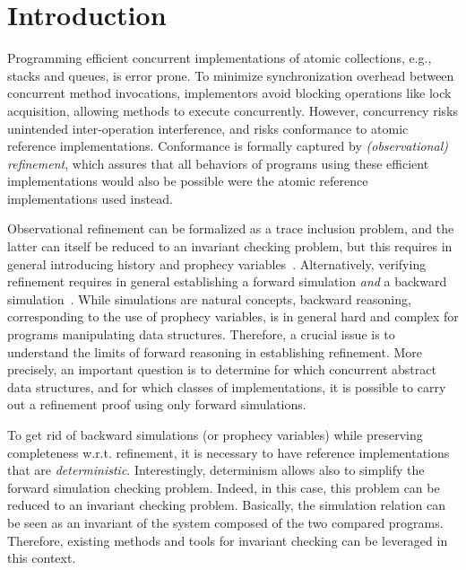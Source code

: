 \section{Introduction}
\vspace{-1mm}
Programming efficient concurrent implementations of atomic collections, e.g., stacks and queues, is error prone. To minimize synchronization overhead between concurrent method invocations, implementors avoid blocking operations like lock acquisition, allowing methods to execute concurrently. However, concurrency risks unintended inter-operation interference, and risks conformance to atomic reference implementations. Conformance is formally captured by \emph{(observational) refinement}, which assures that all behaviors of programs
using these efficient implementations would also be possible were the atomic reference implementations used instead.

Observational refinement can be formalized as a trace inclusion problem, and the latter can itself be reduced to an invariant checking problem, but this requires in general introducing history and prophecy variables~\cite{DBLP:journals/tcs/AbadiL91}. Alternatively, verifying refinement requires in general establishing a forward simulation {\em and} a backward simulation~\cite{DBLP:journals/iandc/LynchV95}. While simulations are natural concepts, backward reasoning, corresponding to the use of prophecy variables, is in general hard and complex for programs manipulating data structures.
Therefore, a crucial issue is to understand the limits of forward reasoning in establishing refinement. More precisely, an important question is to determine for which concurrent abstract data structures, and for which classes of implementations, it is possible to carry out a refinement proof using only forward simulations.

To get rid of backward simulations (or prophecy variables) while preserving completeness w.r.t. refinement, it is necessary to have reference implementations 
that are {\em deterministic}. Interestingly, determinism allows also to simplify the forward simulation checking problem. Indeed, in this case, this problem can be reduced to an invariant checking problem. Basically, the simulation relation can be seen as an invariant of the system composed of the two compared programs. Therefore, existing methods and tools for invariant checking can be leveraged in this context. %


